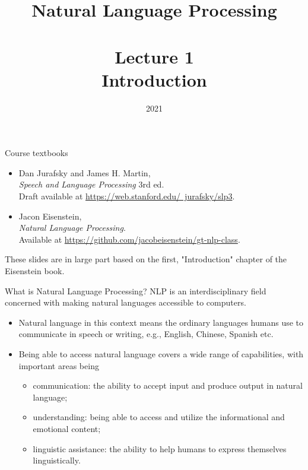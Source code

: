 \documentclass[style=upen, size=14pt]{powerdot}
\newcommand{\gold}{\color{arany}}
\begin{document}
\title{Natural Language Processing\\~~\\Lecture 1\\Introduction}

\date{2021}
\maketitle

\begin{slide}{Course textbooks}
  \pause
  \begin{itemize}
  \item  Dan Jurafsky and James H. Martin,\\
    \emph{Speech and Language Processing} 3rd ed.\\
    Draft available at \href{https://web.stanford.edu/~jurafsky/slp3}{https://web.stanford.edu/~jurafsky/slp3}.\pause
  \item Jacon Eisenstein,\\
    \emph{Natural Language Processing}.\\
    Available at
    \href{https://github.com/jacobeisenstein/gt-nlp-class}{https://github.com/jacobeisenstein/gt-nlp-class}.
  \end{itemize}\pause
  These slides are in large part based on the first, "Introduction" chapter of
  the Eisenstein book.
\end{slide}

\begin{slide}[toc=What is NLP?]{What is Natural Language Processing?}
  {\gold NLP} is an interdisciplinary field concerned with making natural
  languages accessible to computers.\pause
  \begin{itemize}
  \item {\gold Natural language} in this context means the ordinary
    languages humans use to communicate in speech or writing, e.g., English,
    Chinese, Spanish etc.\pause
  \item Being able to {\gold access} natural language covers a wide range
    of capabilities, with important areas being\pause
    \begin{itemize}
    \item {\gold communication}: the ability to accept input and produce
      output in natural language;\pause
    \item {\gold understanding}: being able to access and utilize the
      informational and emotional content;\pause
    \item {\gold linguistic assistance}: the ability to help humans to
      express themselves linguistically.
    \end{itemize}
  \end{itemize}
\end{slide}
\end{document}
